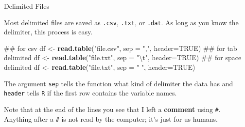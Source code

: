 \documentclass[ignorenonframetext,]{beamer}
\newenvironment{Shaded}{\begin{snugshade}}{\end{snugshade}}
\newcommand{\KeywordTok}[1]{\textcolor[rgb]{0.13,0.29,0.53}{\textbf{{#1}}}}
\newcommand{\DataTypeTok}[1]{\textcolor[rgb]{0.13,0.29,0.53}{{#1}}}
\newcommand{\CharTok}[1]{\textcolor[rgb]{0.31,0.60,0.02}{{#1}}}
\newcommand{\StringTok}[1]{\textcolor[rgb]{0.31,0.60,0.02}{{#1}}}
\newcommand{\OtherTok}[1]{\textcolor[rgb]{0.56,0.35,0.01}{{#1}}}
\newcommand{\NormalTok}[1]{{#1}}
\begin{document}
\begin{frame}[fragile]{Delimited Files}

Most delimited files are saved as \texttt{.csv}, \texttt{.txt}, or
\texttt{.dat}. As long as you know the delimiter, this process is easy.

\begin{Shaded}
\begin{Highlighting}[]
\NormalTok{## for csv}
\NormalTok{df <-}\StringTok{ }\KeywordTok{read.table}\NormalTok{(}\StringTok{"file.csv"}\NormalTok{, }\DataTypeTok{sep =} \StringTok{","}\NormalTok{, }\DataTypeTok{header=}\OtherTok{TRUE}\NormalTok{)}
\NormalTok{## for tab delimited}
\NormalTok{df <-}\StringTok{ }\KeywordTok{read.table}\NormalTok{(}\StringTok{"file.txt"}\NormalTok{, }\DataTypeTok{sep =} \StringTok{"}\CharTok{\textbackslash{}t}\StringTok{"}\NormalTok{, }\DataTypeTok{header=}\OtherTok{TRUE}\NormalTok{)}
\NormalTok{## for space delimited}
\NormalTok{df <-}\StringTok{ }\KeywordTok{read.table}\NormalTok{(}\StringTok{"file.txt"}\NormalTok{, }\DataTypeTok{sep =} \StringTok{" "}\NormalTok{, }\DataTypeTok{header=}\OtherTok{TRUE}\NormalTok{)}
\end{Highlighting}
\end{Shaded}

The argument \texttt{sep} tells the function what kind of delimiter the
data has and \texttt{header} tells \texttt{R} if the first row contains
the variable names.

\small
Note that at the end of the lines you see that I left a \textbf{comment}
using \texttt{\#}. Anything after a \texttt{\#} is not read by the
computer; it's just for us humans.

\end{frame}
\end{document}
